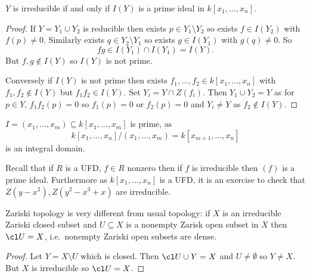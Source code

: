 \documentclass[a4paper]{article}
\begin{document}
\begin{lemma}
  \(Y\) is irreducible if and only if \(I(Y)\) is a prime ideal in \(k[x_1, \dots, x_n]\).
\end{lemma}

\begin{proof}
  If \(Y = Y_1 \cup Y_2\) is reducible then exists \(p \in Y_1 \setminus Y_2\) so exists \(f \in I(Y_2)\) with \(f(p) \neq 0\). Similarly exists \(q \in Y_2 \setminus Y_1\) so exists \(g \in I(Y_1)\) with \(g(q) \neq 0\). So
  \[
    fg \in I(Y_1) \cap I(Y_1) = I(Y).
  \]
  But \(f, g \notin I(Y)\) so \(I(Y)\) is not prime.

  Conversely if \(I(Y)\) is not prime then exists \(f_1, \dots, f_2 \in k[x_1, \dots, x_n]\) with \(f_1, f_2 \notin I(Y)\) but \(f_1f_2 \in I(Y)\). Set \(Y_i = Y \cap Z(f_i)\). Then \(Y_1 \cup Y_2 = Y\) as for \(p \in Y\), \(f_1f_2(p) = 0\) so \(f_1(p) = 0\) or \(f_2(p) = 0\) and \(Y_i \neq Y\) as \(f_2 \notin I(Y)\).
\end{proof}

\begin{eg}
  \(I = (x_1, \dots, x_m) \subseteq k[x_1, \dots, x_m]\) is prime, as
  \[
    k[x_1, \dots, x_n]/(x_1, \dots, x_m) = k[x_{m + 1}, \dots, x_n]
  \]
  is an integral domain.
\end{eg}

\begin{ex}
  Recall that if \(R\) is a UFD, \(f \in R\) nonzero then if \(f\) is irreducible then \((f)\) is a prime ideal. Furthermore as \(k[x_1, \dots, x_n]\) is a UFD, it is an exercise to check that \(Z(y -x^2), Z(y^2 - x^3 + x)\) are irreducible.
\end{ex}

Zariski topology is very different from usual topology: if \(X\) is an irreducible Zariski closed subset and \(U \subseteq X\) is a nonempty Zarisk open subset in \(X\) then \(\cl U = X\), i.e.\ nonempty Zariski open subsets are dense.

\begin{proof}
  Let \(Y = X \setminus U\) which is closed. Then \(\cl U \cup Y = X\) and \(U \neq \emptyset\) so \(Y \neq X\). But \(X\) is irreducible so \(\cl U = X\).
\end{proof}
\end{document}
